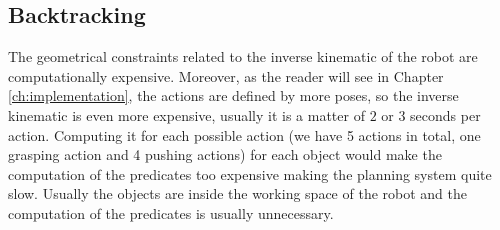 
	
\subsection{Backtracking}

The geometrical constraints related to the inverse kinematic of the robot are computationally expensive. Moreover, as the reader will see in Chapter \ref{ch:implementation}, the actions are defined by more poses, so the inverse kinematic is even more expensive, usually it is a matter of $2$ or $3$ seconds per action. Computing it for each possible action (we have 5 actions in total, one grasping action and 4 pushing actions) for each object would make the computation of the predicates too expensive making the planning system quite slow. Usually the objects are inside the working space of the robot and the computation of the  predicates is usually unnecessary.

